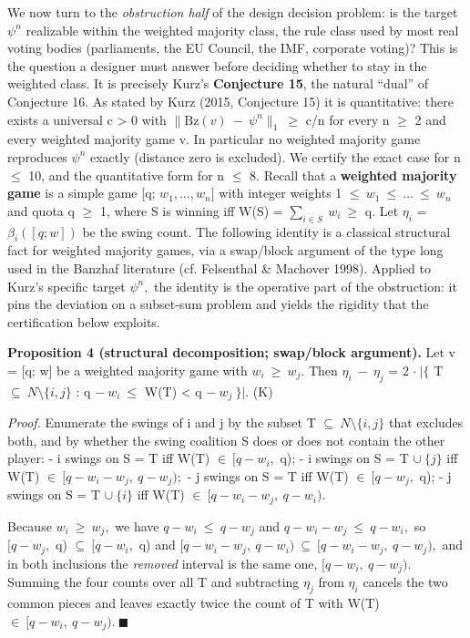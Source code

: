 \documentclass[
]{article}
\begin{document}
We now turn to the \emph{obstruction half} of the design decision
problem: is the target \(\psi^n\) realizable within the weighted
majority class, the rule class used by most real voting bodies
(parliaments, the EU Council, the IMF, corporate voting)? This is the
question a designer must answer before deciding whether to stay in the
weighted class. It is precisely Kurz's \textbf{Conjecture 15}, the
natural ``dual'' of Conjecture 16. As stated by Kurz (2015, Conjecture
15) it is quantitative: there exists a universal c \textgreater{} 0 with
\(\|\mathrm{Bz}(v)\ -\ \psi^n\|_1\ \ge\) c/n for every n \(\ge\) 2 and
every weighted majority game v. In particular no weighted majority game
reproduces \(\psi^n\) exactly (distance zero is excluded). We certify
the exact case for n \(\le\) 10, and the quantitative form for n \(\le\)
8. Recall that a \textbf{weighted majority game} is a simple game {[}q;
\(w_1,\dots,w_n]\) with integer weights 1
\(\le\ w_1\ \le\ \dots\ \le\ w_n\) and quota q \(\ge\) 1, where S is
winning iff W(S) = \(\sum_{i\in S}\ w_i\ \ge\) q. Let \(\eta_i\) =
\(\beta_i([q;w])\) be the swing count. The following identity is a
classical structural fact for weighted majority games, via a swap/block
argument of the type long used in the Banzhaf literature (cf. Felsenthal
\& Machover 1998). Applied to Kurz's specific target \(\psi^n,\) the
identity is the operative part of the obstruction: it pins the deviation
on a subset-sum problem and yields the rigidity that the certification
below exploits.

\textbf{Proposition 4 (structural decomposition; swap/block argument).}
Let v = {[}q; w{]} be a weighted majority game with \(w_i\ \ge\ w_j.\)
Then \(\eta_i\ -\ \eta_j\) = 2 \(\cdot\ \vert\{\) T
\(\subseteq\ N\setminus\{i,j\}\) : q \(-\ w_i\ \le\) W(T) \textless{} q
\(-\ w_j\ \}\vert.\) (K)

\emph{Proof.} Enumerate the swings of i and j by the subset T
\(\subseteq\ N\setminus\{i,j\}\) that excludes both, and by whether the
swing coalition S does or does not contain the other player: - i swings
on S = T iff W(T) \(\in\ [q-w_i,\) q); - i swings on S = T
\(\cup\ \{j\}\) iff W(T) \(\in\ [q-w_i-w_j,\ q-w_j);\) - j swings on S =
T iff W(T) \(\in\ [q-w_j,\) q); - j swings on S = T \(\cup\ \{i\}\) iff
W(T) \(\in\ [q-w_i-w_j,\ q-w_i).\)

Because \(w_i\ \ge\ w_j,\) we have \(q-w_i\ \le\ q-w_j\) and
\(q-w_i-w_j\ \le\ q-w_i,\) so \([q-w_j,\) q) \(\subseteq\ [q-w_i,\) q)
and \([q-w_i-w_j,\ q-w_i)\ \subseteq\ [q-w_i-w_j,\ q-w_j),\) and in both
inclusions the \emph{removed} interval is the same one,
\([q-w_i,\ q-w_j).\) Summing the four counts over all T and subtracting
\(\eta_j\) from \(\eta_i\) cancels the two common pieces and leaves
exactly twice the count of T with W(T)
\(\in\ [q-w_i,\ q-w_j).\ \blacksquare\)
\end{document}
